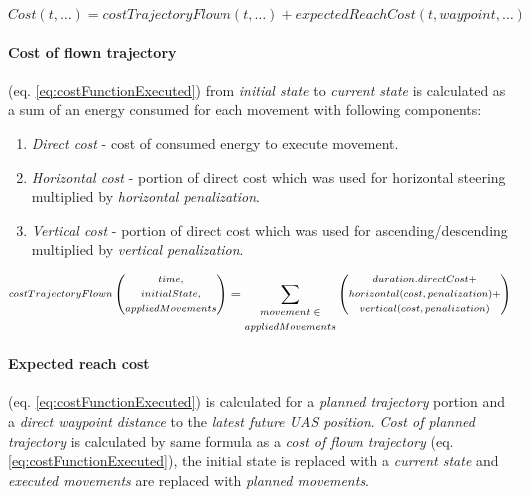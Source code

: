 \begin{equation}\label{eq:consFunctionMeta}
    Cost (t,\dots)= costTrajectoryFlown(t,\dots) + expectedReachCost(t,waypoint,\dots)
\end{equation}


\paragraph{Cost of flown trajectory} (eq. \ref{eq:costFunctionExecuted}) from \emph{initial state} to \emph{current state} is calculated as a sum of an energy consumed for each movement with following components:
\begin{enumerate}
    \item \emph{Direct cost} - cost of consumed energy to execute movement.
    \item \emph{Horizontal cost} - portion of direct cost which was used for horizontal steering multiplied by \emph{horizontal penalization}.
    \item \emph{Vertical cost} - portion of direct cost which was used for ascending/descending multiplied by \emph{vertical penalization}.
\end{enumerate}


\begin{equation}\label{eq:costFunctionExecuted}
   \scriptsize \begin{gathered}costTrajectoryFlown \end{gathered} \left (\begin{gathered}time,\\ initialState,\\ appliedMovements \end{gathered}\right) = \sum_{\begin{gathered}  movement\in\\ appliedMovements\end{gathered}\normalsize} \left(\begin{gathered}
        duration.directCost+\\
        horizontal(cost,penalization)+\\
        vertical(cost,penalization)
   \end{gathered}
   \right) 
   \normalsize
\end{equation}
 
\paragraph{Expected reach cost} (eq. \ref{eq:costFunctionExecuted}) is calculated for a \emph{planned trajectory} portion and a \emph{direct waypoint distance} to the \emph{latest future UAS position}. \emph{Cost of planned trajectory} is calculated by same formula as a \emph{cost of flown trajectory} (eq. \ref{eq:costFunctionExecuted}), the initial state is replaced with a  \emph{current state} and \emph{executed movements} are replaced with \emph{planned movements}.
    
